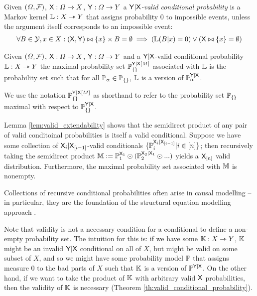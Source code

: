 \begin{definition}\label{def:valid_conditional_prob}
Given $(\Omega,\mathcal{F})$, $\mathsf{X}:\Omega\to X$, $\mathsf{Y}:\Omega\to Y$ a \emph{$\mathsf{Y}|\mathsf{X}$-valid conditional probability} is a Markov kernel $\mathbb{L}:X\rightarrowtriangle Y$ that assigns probability 0 to impossible events, unless the argument itself corresponds to an impossible event:
\begin{align}
    \forall B\in \mathcal{Y}, x\in X: (\mathsf{X},\mathsf{Y})\bowtie \{x\}\times B = \emptyset \implies \left(\mathbb{L}(B|x) = 0\right) \lor \left(\mathsf{X}\bowtie \{x\} = \emptyset\right)
\end{align}
\end{definition}

\begin{definition}
Given $(\Omega,\mathcal{F})$, $\mathsf{X}:\Omega\to X$, $\mathsf{Y}:\Omega\to Y$ and a $\mathsf{Y}|\mathsf{X}$-valid conditional probability $\mathbb{L}:X\rightarrowtriangle Y$ the maximal probability set $\mathbb{P}_{\{\}}^{\mathsf{Y}|\mathsf{X}[M]}$ associated with $\mathbb{L}$ is the probability set such that for all $\mathbb{P}_\alpha\in \mathbb{P}_{\{\}}$, $\mathbb{L}$ is a version of $\mathbb{P}_\alpha^{\mathsf{Y}|\mathsf{X}}$.
\end{definition}

We use the notation $\mathbb{P}_{\{\}}^{\mathsf{Y}|\mathsf{X}[M]}$ as shorthand to refer to the probability set $\mathbb{P}_{\{\}}$ maximal with respect to $\mathbb{P}_{\{\}}^{\mathsf{Y}|\mathsf{X}}$.

Lemma \ref{lem:valid_extendability} shows that the semidirect product of any pair of valid conditoinal probabilities is itself a valid conditional. Suppose we have some collection of $\mathsf{X}_i|\mathsf{X}_{[i-1]}$-valid conditionals $\{\mathbb{P}_i^{\mathsf{X}_i|\mathsf{X}_{[i-1]}}|i\in [n]\}$; then recursively taking the semidirect product $\mathbb{M}:=\mathbb{P}_1^{\mathsf{X}_1}\odot (\mathbb{P}_2^{\mathsf{X}_2|\mathsf{X}_{1}}\odot ...)$ yields a $\mathsf{X}_{[n]}$ valid distribution. Furthermore, the maximal probability set associated with $\mathbb{M}$ is nonempty.

Collections of recursive conditional probabilities often arise in causal modelling -- in particular, they are the foundation of the structural equation modelling approach \citet{richardson2013single,pearl_causality:_2009}.

Note that validity is not a necessary condition for a conditional to define a non-empty probability set. The intuition for this is: if we have some $\mathbb{K}:X\rightarrowtriangle Y$, $\mathbb{K}$ might be an invalid $\mathsf{Y}|\mathsf{X}$ conditional on all of $X$, but might be valid on some subset of $X$, and so we might have some probability model $\mathbb{P}$ that assigns measure 0 to the bad parts of $X$ such that $\mathbb{K}$ is a version of $\mathbb{P}^{\mathsf{Y}|\mathsf{X}}$. On the other hand, if we want to take the product of $\mathbb{K}$ with arbitrary valid $\mathsf{X}$ probabilities, then the validity of $\mathbb{K}$ is necessary (Theorem \ref{th:valid_conditional_probability}).

